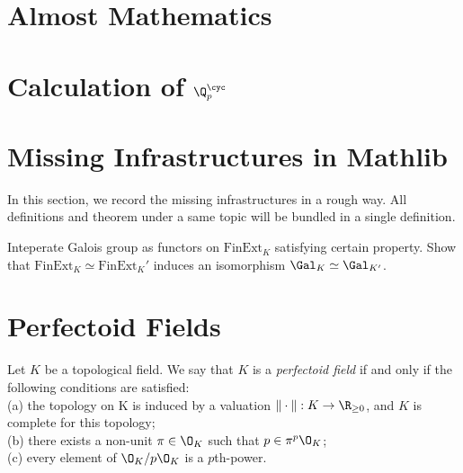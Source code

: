 
\section{Almost Mathematics}

\section{Calculation of $\Q_p^{\cyc}$}

\section{Missing Infrastructures in Mathlib}
In this section, we record the missing infrastructures in a rough way. All definitions and theorem under a same topic will be bundled in a single definition.

\begin{definition}
    \label{Relate Galois Group with Category of Finite Field Extensions}
    \notready

    Inteperate Galois group as functors on $ \text{FinExt}_K $ satisfying certain property. Show that $\text{FinExt}_K \simeq \text{FinExt}_K'$ induces an isomorphism $\Gal_K \simeq \Gal_{K'}$.
\end{definition}

\section{Perfectoid Fields}

\begin{definition}
    \label{Perfectoid Field}

    Let $K$ be a topological field. We say that $K$ is a \emph{perfectoid field} if and only if the following conditions are satisfied:\\
    (a) the topology on K is induced by a valuation $\| \cdot \| : K \to \R_{\ge0}$, and $K$ is complete for this topology;\\
    (b) there exists a non-unit $\pi \in \O_K$ such that $p \in \pi^p \O_K$;\\
    (c) every element of $\O_K/p\O_K$ is a $p$th-power.
\end{definition}


